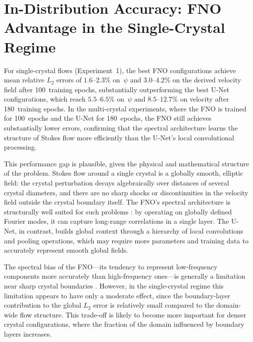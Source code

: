 \section{In-Distribution Accuracy: FNO Advantage in the Single-Crystal Regime}

For single-crystal flows (Experiment~1), the best FNO configurations achieve mean relative $L_2$ errors of $1.6$--$2.3\%$ on~$\psi$ and $3.0$--$4.2\%$ on the derived velocity field after 100~training epochs, substantially outperforming the best U-Net configurations, which reach $5.5$--$6.5\%$ on~$\psi$ and $8.5$--$12.7\%$ on velocity after 180~training epochs. In the multi-crystal experiments, where the FNO is trained for 100~epochs and the U-Net for 180~epochs, the FNO still achieves substantially lower errors, confirming that the spectral architecture learns the structure of Stokes flow more efficiently than the U-Net's local convolutional processing.

This performance gap is plausible, given the physical and mathematical structure of the problem. Stokes flow around a single crystal is a globally smooth, elliptic field: the crystal perturbation decays algebraically over distances of several crystal diameters, and there are no sharp shocks or discontinuities in the velocity field outside the crystal boundary itself. The FNO's spectral architecture is structurally well suited for such problems \parencite{li_fourier_2021}: by operating on globally defined Fourier modes, it can capture long-range correlations in a single layer. The U-Net, in contrast, builds global context through a hierarchy of local convolutions and pooling operations, which may require more parameters and training data to accurately represent smooth global fields.

The spectral bias of the FNO—its tendency to represent low-frequency components more accurately than high-frequency ones—is generally a limitation near sharp crystal boundaries \parencite{qin_toward_2024}. However, in the single-crystal regime this limitation appears to have only a moderate effect, since the boundary-layer contribution to the global $L_2$ error is relatively small compared to the domain-wide flow structure. This trade-off is likely to become more important for denser crystal configurations, where the fraction of the domain influenced by boundary layers increases.

